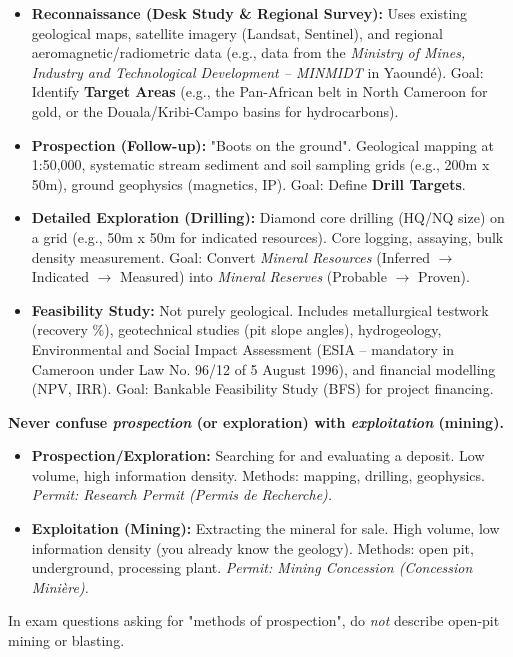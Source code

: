 \documentclass[11pt]{article}
\begin{document}
\begin{aretenir}
\begin{itemize}
\item \textbf{Reconnaissance (Desk Study \& Regional Survey):} Uses existing geological maps, satellite imagery (Landsat, Sentinel), and regional aeromagnetic/radiometric data (e.g., data from the \emph{Ministry of Mines, Industry and Technological Development -- MINMIDT} in Yaoundé). Goal: Identify \textbf{Target Areas} (e.g., the Pan-African belt in North Cameroon for gold, or the Douala/Kribi-Campo basins for hydrocarbons).
\item \textbf{Prospection (Follow-up):} "Boots on the ground". Geological mapping at 1:50,000, systematic stream sediment and soil sampling grids (e.g., 200m x 50m), ground geophysics (magnetics, IP). Goal: Define \textbf{Drill Targets}.
\item \textbf{Detailed Exploration (Drilling):} Diamond core drilling (HQ/NQ size) on a grid (e.g., 50m x 50m for indicated resources). Core logging, assaying, bulk density measurement. Goal: Convert \emph{Mineral Resources} (Inferred $\to$ Indicated $\to$ Measured) into \emph{Mineral Reserves} (Probable $\to$ Proven).
\item \textbf{Feasibility Study:} Not purely geological. Includes metallurgical testwork (recovery \%), geotechnical studies (pit slope angles), hydrogeology, Environmental and Social Impact Assessment (ESIA -- mandatory in Cameroon under Law No. 96/12 of 5 August 1996), and financial modelling (NPV, IRR). Goal: Bankable Feasibility Study (BFS) for project financing.
\end{itemize}
\end{aretenir}

\begin{attention}
\textbf{Never confuse \emph{prospection} (or exploration) with \emph{exploitation} (mining).}
\begin{itemize}
\item \textbf{Prospection/Exploration:} Searching for and evaluating a deposit. Low volume, high information density. Methods: mapping, drilling, geophysics. \textit{Permit: Research Permit (Permis de Recherche).}
\item \textbf{Exploitation (Mining):} Extracting the mineral for sale. High volume, low information density (you already know the geology). Methods: open pit, underground, processing plant. \textit{Permit: Mining Concession (Concession Minière).}
\end{itemize}
In exam questions asking for "methods of prospection", do \emph{not} describe open-pit mining or blasting.
\end{attention}
\end{document}

